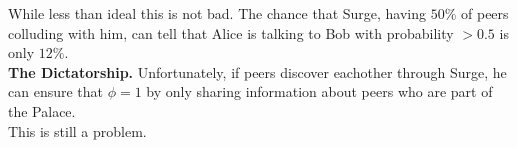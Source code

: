 \documentclass{paper}
\begin{document}
While less than ideal this is not bad. The chance that Surge, having $50\%$ of peers colluding with him, can tell that Alice is talking to Bob with probability $> 0.5$ is only $12\%$. 
\\
\textbf{The Dictatorship.}
Unfortunately, if peers discover eachother through Surge, he can ensure that $\phi = 1$ by only sharing information about peers who are part of the Palace. 
\\
This is still a problem.


\end{document}

